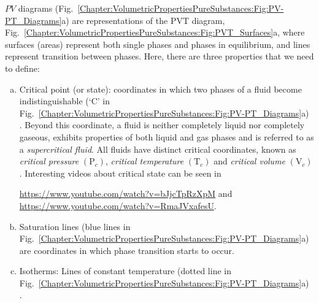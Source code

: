 $PV$ diagrams (\eg Fig.~\ref{Chapter:VolumetricPropertiesPureSubstances:Fig:PV-PT_Diagrams}a) are representations of the PVT diagram, Fig.~\ref{Chapter:VolumetricPropertiesPureSubstances:Fig:PVT_Surfaces}a, where surfaces (\ie areas) represent both single phases and phases in equilibrium, and lines represent transition between phases. Here, there are three properties that we need to define:
           \begin{enumerate}[a)]
              \item Critical point (or state): coordinates in which two phases of a fluid become indistinguishable (`C' in Fig.~\ref{Chapter:VolumetricPropertiesPureSubstances:Fig:PV-PT_Diagrams}a) . Beyond this coordinate, a fluid is neither completely liquid nor completely gaseous, \ie exhibits properties of both liquid and gas phases and is referred to as a {\it supercritical fluid}. All fluids have distinct critical coordinates, known as {\it critical pressure} $\left(\text{P}_{c}\right)$, {\it critical temperature} $\left(\text{T}_{c}\right)$ and {\it critical volume} $\left(\text{V}_{c}\right)$. Interesting videos about critical state can be seen in 
                  \begin{center}
                     \href{https://www.youtube.com/watch?v=bJjcTpRzXpM}{https://www.youtube.com/watch?v=bJjcTpRzXpM} and \\
                     \href{https://www.youtube.com/watch?v=RmaJVxafesU}{https://www.youtube.com/watch?v=RmaJVxafesU}.
                  \end{center}
              \item Saturation lines (blue lines in Fig.~\ref{Chapter:VolumetricPropertiesPureSubstances:Fig:PV-PT_Diagrams}a) are coordinates in which phase transition starts to occur.
              \item Isotherms: Lines of constant temperature (dotted line in Fig.~\ref{Chapter:VolumetricPropertiesPureSubstances:Fig:PV-PT_Diagrams}a) .
           \end{enumerate}

